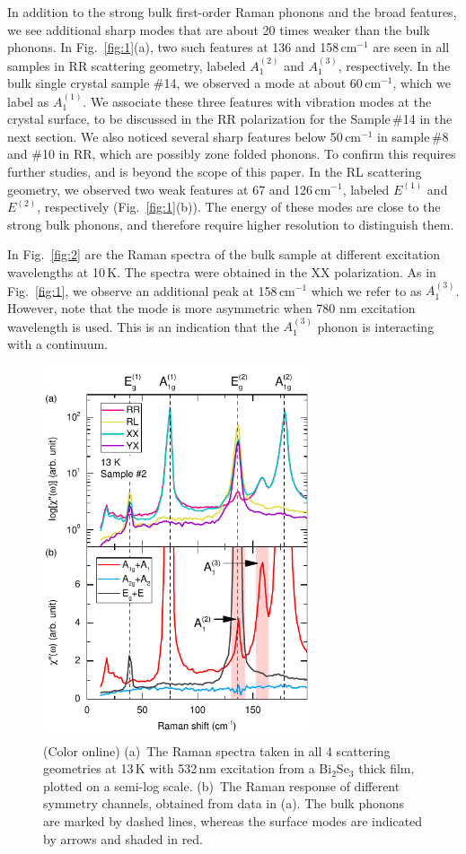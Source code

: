 \documentclass[reprint,aps,pra,superscriptaddress,amsmath,amssymb,linenumbers,longbibliography]{revtex4-1}
\begin{document}
In addition to the strong bulk first-order Raman phonons and the broad features, we see additional sharp modes that are about 20 times weaker than the bulk phonons.
In Fig.~\ref{fig:1}(a), two such features at 136 and 158\,cm$^{-1}$ are seen in all samples in RR scattering geometry, labeled $A_1^{(2)}$ and $A_1^{(3)}$, respectively.
In the bulk single crystal sample \#14, we observed a mode at about 60\,cm$^{-1}$, which we label as $A_1^{(1)}$.
We associate these three features with vibration modes at the crystal surface, to be discussed in the RR polarization for the Sample\,\#14 in the next section.
We also noticed several sharp features below 50\,cm$^{-1}$ in sample\,\#8 and \#10 in RR, which are possibly zone folded phonons.
To confirm this requires further studies, and is beyond the scope of this paper.
In the RL scattering geometry, we observed two weak features at 67 and 126\,cm$^{-1}$, labeled $E^{(1)}$ and $E^{(2)}$, respectively (Fig.~\ref{fig:1}(b)).
The energy of these modes are close to the strong bulk phonons, and therefore require higher resolution to distinguish them.

In Fig.~\ref{fig:2} are the Raman spectra of the bulk sample at different excitation wavelengths at 10\,K. 
The spectra were obtained in the XX polarization. 
As in Fig.~\ref{fig:1}, we observe an additional peak at 158\,cm$^{-1}$ which we refer to as $A_1^{(3)}$. 
However, note that the mode is more asymmetric when 780 nm excitation wavelength is used.
This is an indication that the $A_1^{(3)}$ phonon is interacting with a continuum.
%
\begin{figure}[t]
	\includegraphics[width=8cm]{Fig3.pdf}
	\caption{\label{fig:sym}(Color online)
		(a)~The Raman spectra taken in all 4 scattering geometries at 13\,K with 532\,nm excitation from a Bi$_2$Se$_3$ thick film, plotted on a semi-log scale.
		(b)~The Raman response of different symmetry channels, obtained from data in (a).
		The bulk phonons are marked by dashed lines, whereas the surface modes are indicated by arrows and shaded in red.
	}
\end{figure}
\end{document}
